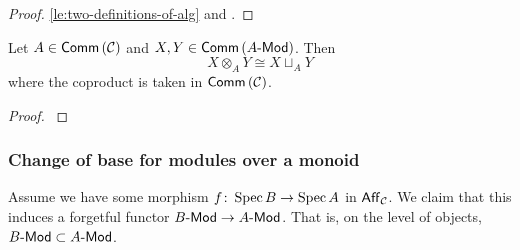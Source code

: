         \begin{proof}
            \cref{le:two-definitions-of-alg} and \cite[Propositions~1.2.14,~1.2.17~\S1.2]{Marty:2009tj}.
        \end{proof}

        \begin{lemma}\label{le:otimes-is-sqcup}
            Let $A\in\mathsf{Comm}\left({\mathcal{C}}\right)$ and $X,Y\in\mathsf{Comm}\left({{{A}\hbox{-}\mathsf{Mod}}}\right)$.
            Then
            \begin{equation*}
                X\otimes_A Y\cong X\sqcup_A Y
            \end{equation*}
            where the coproduct is taken in $\mathsf{Comm}\left({\mathcal{C}}\right)$.
        \end{lemma}

        \begin{proof}
            \cite[Proposition~1.2.6,~\S1.2,~p.16]{Marty:2009tj}
        \end{proof}
    


    \subsubsection{Change of base for modules over a monoid} %
    \label{ssub:change_of_base_for_modules_over_a_monoid}

        Assume we have some morphism $f\colon\operatorname{Spec} B\to\operatorname{Spec} A$ in $\mathsf{Aff}_{\mathcal{C}}$.
        We claim that this induces a forgetful functor ${{B}\hbox{-}\mathsf{Mod}}\to{{A}\hbox{-}\mathsf{Mod}}$.
        That is, on the level of objects, ${{B}\hbox{-}\mathsf{Mod}}\subset{{A}\hbox{-}\mathsf{Mod}}$.

